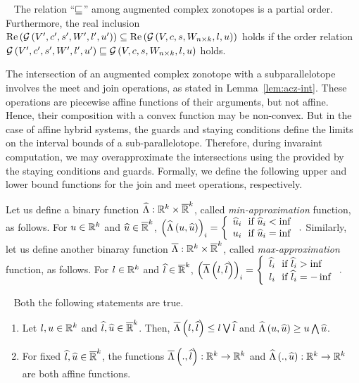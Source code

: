 %
\begin{lemma}~\label{lem:gcz-gcz} The relation ``$\sqsubseteq$'' among
augmented complex zonotopes is a partial order.  Furthermore, the real
inclusion\\
$\operatorname{\operatorname{Re}}\left(\mathcal{G}\left(V^\prime,c^\prime,s^\prime,W^\prime,l^\prime,u^\prime\right)\right)\subseteq \operatorname{\operatorname{Re}}\left(\mathcal{G}\left(V,c,s,W_{n\times
k},l,u\right)\right)$ holds if the order relation
$\mathcal{G}\left(V^\prime,c^\prime,s^\prime,W^\prime,l^\prime,u^\prime\right)\sqsubseteq \mathcal{G}\left(V,c,s,W_{n\times
k},l,u\right)$ holds.
\end{lemma}

The intersection of an augmented complex zonotope with a
subparallelotope involves the meet and join operations, as stated in
Lemma~\ref{lem:acz-int}.  These operations are piecewise affine
functions of their arguments, but not affine.  Hence, their
composition with a convex function may be non-convex.  But in the case
of affine hybrid systems, the guards and staying conditions define the
limits on the interval bounds of a sub-parallelotope.  Therefore,
during invaraint computation, we may overapproximate the intersections
using the provided by the staying conditions and guards.  Formally, we
define the following upper and lower bound functions for the join and
meet operations, respectively.

Let us define a binary function
$\widehat{\Lambda}:\mathbb{R}^k\times\mathbb{\overline{R}}^k$,
called \emph{min-approximation} function, as follows.  For
$u\in\mathbb{R}^k$ and $\widehat{u}\in\mathbb{\overline{R}}^k$,
$\left(\widehat{\Lambda}\left(u,\widehat{u}\right)\right)_i = \left\{
\begin{array}{l}
\widehat{u}_i~~\text{if}~\widehat{u}_i<\inf\\
u_i~~\text{if}~\widehat{u}_i=\inf
\end{array}
\right..$
Similarly, let us define another binaray function       
$\overline{\Lambda}:\mathbb{R}^k\times\mathbb{\overline{R}}^k$,
called \emph{max-approximation} function, as follows.  For
$l\in\mathbb{R}^k$ and $\widehat{l}\in\mathbb{\overline{R}}^k$,
$\left(\overline{\Lambda}\left(l,\widehat{l}\right)\right)_i = \left\{
\begin{array}{l}
\widehat{l}_i~~\text{if}~\widehat{l}_i>\inf\\
l_i~~\text{if}~\widehat{l}_i=-\inf
\end{array}
\right..$
%
\begin{lemma}~\label{lem:min-max-approx}
Both the following statements are true.
\begin{enumerate}
\item Let $l,u\in\mathbb{R}^k$ and $\widehat{l},\widehat{u}\in\mathbb{\overline{R}}^k$.
  Then, $\overline{\Lambda}\left(l,\widehat{l}\right)\leq l\bigvee\widehat{l}$ and
  $\widehat{\Lambda}\left(u,\widehat{u}\right)\geq u\bigwedge\widehat{u}$.
\item For fixed $\widehat{l},\widehat{u}\in\mathbb{\overline{R}}^k$, the functions
  $\overline{\Lambda}\left(.,\widehat{l}\right):\mathbb{R}^k\rightarrow\mathbb{R}^k$ and
  $\widehat{\Lambda}\left(.,\widehat{u}\right):\mathbb{R}^k\rightarrow\mathbb{R}^k$ are both affine functions.
\end{enumerate}
\end{lemma}





